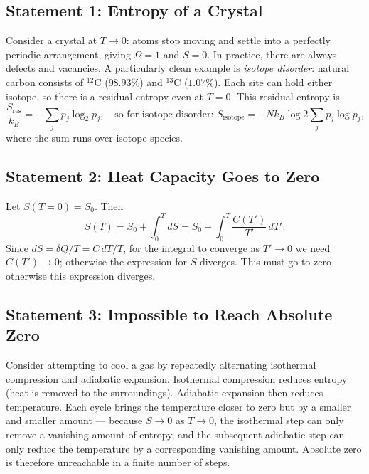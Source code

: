 \subsection{Statement 1: Entropy of a Crystal}

Consider a crystal at $T\to 0$: atoms stop moving and settle into a perfectly periodic arrangement, giving $\Omega = 1$ and $S = 0$. In practice, there are always defects and vacancies. A particularly clean example is \emph{isotope disorder}: natural carbon consists of ${}^{12}$C ($98.93\%$) and ${}^{13}$C ($1.07\%$). Each site can hold either isotope, so there is a residual entropy even at $T = 0$. This residual entropy is
\begin{equation}
    \frac{S_\text{res}}{k_B} = -\sum_j p_j \log_2 p_j,
    \quad \text{so for isotope disorder: }
    S_\text{isotope} = -Nk_B \log 2 \sum_j p_j \log p_j,
\end{equation}
where the sum runs over isotope species.

\subsection{Statement 2: Heat Capacity Goes to Zero}

Let $S(T=0) = S_0$. Then
\begin{equation}
    S(T) = S_0 + \int_0^T dS = S_0 + \int_0^T \frac{C(T')}{T'}\,dT'.
\end{equation}
Since $dS = \delta Q / T = C\,dT/T$, for the integral to converge as $T'\to 0$ we need $C(T')\to 0$; otherwise the expression for $S$ diverges. This must go to zero otherwise this expression diverges.

\subsection{Statement 3: Impossible to Reach Absolute Zero}

Consider attempting to cool a gas by repeatedly alternating isothermal compression and adiabatic expansion. Isothermal compression reduces entropy (heat is removed to the surroundings). Adiabatic expansion then reduces temperature. Each cycle brings the temperature closer to zero but by a smaller and smaller amount --- because $S\to 0$ as $T\to 0$, the isothermal step can only remove a vanishing amount of entropy, and the subsequent adiabatic step can only reduce the temperature by a corresponding vanishing amount. Absolute zero is therefore unreachable in a finite number of steps.


